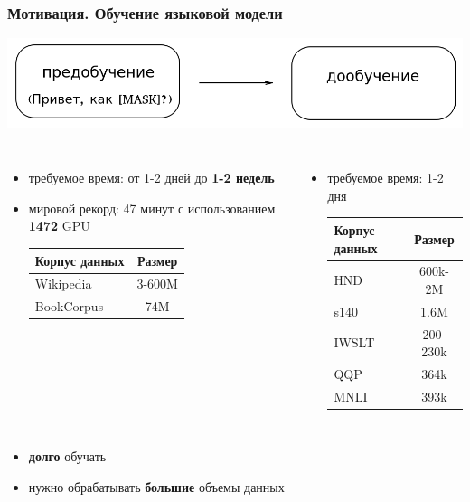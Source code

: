 \documentclass{beamer}
\begin{document}
\begin{frame}
	\frametitle{Мотивация. Обучение языковой модели}
	\includegraphics[scale=0.4]{pre_training_fine_tuning.png}
	\begin{columns}
			\begin{itemize}
				\item требуемое время: от 1-2 дней до {\bf 1-2 недель}
				\item мировой рекорд: 47 минут с использованием {\bf 1472} GPU

				\begin{table}
					\begin{tabular}{l|c}
						Корпус данных & Размер \\
						\hline\hline
						Wikipedia & 3-600M \\
						BookCorpus & 74M\\
					\end{tabular}
				\end{table}
			\end{itemize}
			\begin{itemize}
				\item требуемое время: 1-2 дня

				\begin{table}
					\begin{tabular}{l|c}
						Корпус данных & Размер \\
						\hline\hline
						HND & 600k-2M \\
						s140 & 1.6M \\
						IWSLT & 200-230k \\
						QQP & 364k \\
						MNLI & 393k \\
					\end{tabular}
				\end{table}
			\end{itemize}
	\end{columns}
	\noindent\makebox[\linewidth]{\rule{\paperwidth}{0.4pt}}
	\begin{itemize}
		\item {\bf долго} обучать
		\item нужно обрабатывать {\bf большие} объемы данных
	\end{itemize}
\end{frame}
\end{document}
